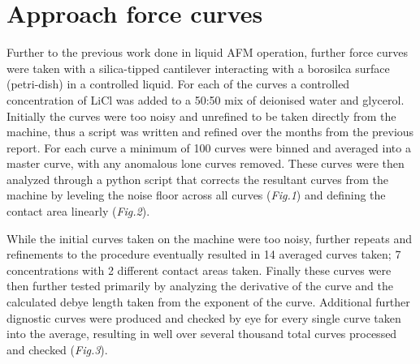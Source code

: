 
\chapter{Approach force curves}

Further to the previous work done in liquid AFM operation, further force curves were taken with a silica-tipped cantilever interacting with a borosilca surface (petri-dish) in a controlled liquid. For each of the curves a controlled concentration of LiCl was added to a 50:50 mix of deionised water and glycerol. Initially the curves were too noisy and unrefined to be taken directly from the machine, thus a script was written and refined over the months from the previous report. For each curve a minimum of 100 curves were binned and averaged into a master curve, with any anomalous lone curves removed. These curves were then analyzed through a python script that corrects the resultant curves from the machine by leveling the noise floor across all curves (\textit{Fig.1}) and defining the contact area linearly (\textit{Fig.2}). 


\newpage

While the initial curves taken on the machine were too noisy, further repeats and refinements to the procedure eventually resulted in 14 averaged curves taken; 7 concentrations with 2 different contact areas taken. Finally these curves were then further tested primarily by analyzing the derivative of the curve and the calculated debye length taken from the exponent of the curve. Additional further dignostic curves were produced and checked by eye for every single curve taken into the average, resulting in well over several thousand total curves processed and checked (\textit{Fig.3}).

